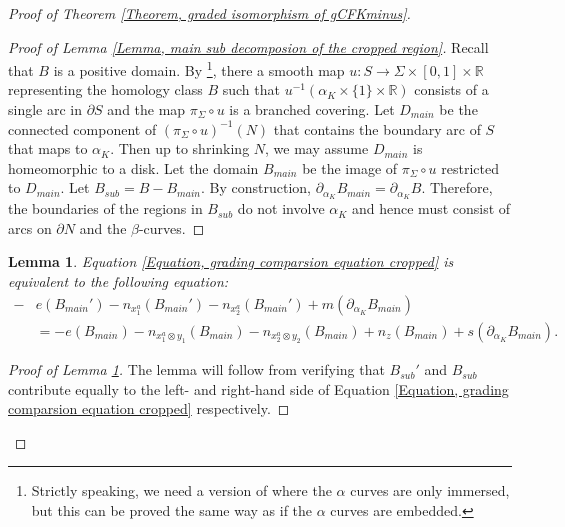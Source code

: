 \documentclass{amsart}
\newtheorem{lem}[thm]{Lemma}
\theoremstyle{definition}
\theoremstyle{remark}
\numberwithin{equation}{section}
\numberwithin{equation}{section} \makeatletter
\begin{document}
\begin{proof}[Proof of Theorem \ref{Theorem, graded isomorphism of gCFKminus}]
\begin{proof}[Proof of Lemma \ref{Lemma, main sub decomposion of the cropped region}]
Recall that $B$ is a positive domain. By \cite[Lemma $4.1'$]{Lipshitz2014a}\footnote{Strictly speaking, we need a version of \cite[Lemma $4.1'$]{Lipshitz2014a} where the $\alpha$ curves are only immersed, but this can be proved the same way as if the $\alpha$ curves are embedded.}, there a smooth map $u:S\rightarrow \Sigma\times[0,1]\times \mathbb{R}$ representing the homology class $B$ such that $u^{-1}(\alpha_K\times\{1\}\times \mathbb{R})$ consists of a single arc in $\partial S$ and the map $\pi_{\Sigma}\circ u$ is a branched covering. Let $D_{main}$ be the connected component of $(\pi_{\Sigma}\circ u)^{-1}(N)$ that contains the boundary arc of $S$ that maps to $\alpha_{K}$. Then up to shrinking $N$, we may assume $D_{main}$ is homeomorphic to a disk. Let the domain $B_{main}$ be the image of $\pi_{\Sigma}\circ u$ restricted to $D_{main}$. Let $B_{sub}=B-B_{main}$. By construction, $\partial_{\alpha_{K}}B_{main}=\partial_{\alpha_{K}}B$. Therefore, the boundaries of the regions in $B_{sub}$ do not involve $\alpha_{K}$ and hence must consist of arcs on $\partial N$ and the $\beta$-curves. 
\end{proof}

\begin{lem}\label{Lemma, grading comparison reduction}
Equation \ref{Equation, grading comparsion equation cropped} is equivalent to the following equation:
\begin{equation}\label{Equation, grading comparision reduction}
	\begin{aligned}
	-&e(B_{main}')-n_{x_1^a}(B_{main}')-n_{x_2^a}(B_{main}')+m(\partial_{\alpha_K}B_{main})\\&=-e(B_{main})-n_{x_1^a \otimes y_1}(B_{main})-n_{x_2^a \otimes y_2}(B_{main})+n_z(B_{main})+ s(\partial_{\alpha_{K}}B_{main}).
	\end{aligned}
\end{equation}
\end{lem}
\begin{proof}[Proof of Lemma \ref{Lemma, grading comparison reduction}]
The lemma will follow from verifying that $B_{sub}'$ and $B_{sub}$ contribute equally to the left- and right-hand side of Equation \ref{Equation, grading comparsion equation cropped} respectively. 


\end{proof}
\end{proof}
\end{document}
